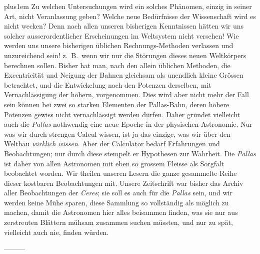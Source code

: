 \begingroup\rightskip=0pt plus1em\relax
Zu welchen Untersuchungen wird ein solches Phänomen, einzig in seiner Art, nicht Veranlassung geben? Welche neue Bedürfnisse der Wissenschaft wird es nicht wecken? Denn nach allen unseren bisherigen Kenntnissen hätten wir uns solcher ausserordentlicher Erscheinungen im Weltsystem nicht versehen! Wie werden uns unsere bisherigen üblichen Rechnungs-Methoden verlassen und unzureichend sein! z.\ B.\ wenn wir nur die Störungen dieses neuen Weltkörpers berechnen sollen. Bisher hat man, nach den allein üblichen Methoden, die Excentricität und Neigung der Bahnen gleichsam als unendlich kleine Grössen betrachtet, und die Entwickelung nach den Potenzen derselben, mit Vernachlässigung der höhern, vorgenommen. Dies wird aber nicht mehr der Fall sein können bei zwei so starken Elementen der Pallas-Bahn, deren höhere Potenzen gewiss nicht vernachlässigt werden dürfen. Daher gründet vielleicht auch die \textit{Pallas} nothwendig eine neue Epoche in der physischen Astronomie. Nur was wir durch strengen Calcul wissen, ist ja das einzige, was wir über den Weltbau \textit{wirklich wissen}. Aber der Calculator bedarf Erfahrungen und Beobachtungen; nur durch diese stempelt er Hypothesen zur Wahrheit. Die \textit{Pallas} ist daher von allen Astronomen mit eben so grossem Fleisse als Sorgfalt beobachtet worden. Wir theilen unseren Lesern die ganze gesammelte Reihe dieser kostbaren Beobachtungen mit. Unsere Zeitschrift war bisher das Archiv aller Beobachtungen der \textit{Ceres}; sie soll es auch für die \textit{Pallas} sein, und wir werden keine Mühe sparen, diese Sammlung so vollständig als möglich zu machen, damit die Astronomen hier alles beisammen finden, was sie nur aus zerstreuten Blättern mühsam zusammen suchen müssten, und nur zu spät, vielleicht auch nie, finden würden.\par\endgroup

—\quad —\quad —

